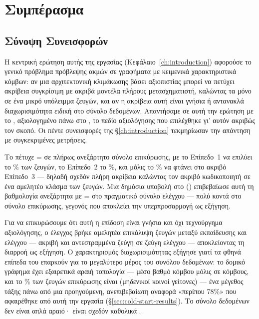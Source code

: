 

\chapter{Συμπέρασμα}
\label{ch:conclusion}


\section{Σύνοψη Συνεισφορών}
\label{sec:summary}

Η κεντρική ερώτηση αυτής της εργασίας (Κεφάλαιο~\ref{ch:introduction}) αφορούσε το
γενικό πρόβλημα πρόβλεψης ακμών σε γραφήματα με κειμενικά χαρακτηριστικά κόμβων: αν
μια αρχιτεκτονική κλιμάκωσης βάσει αξιοπιστίας μπορεί να πετύχει ακρίβεια
συγκρίσιμη με ακριβά μοντέλα πλήρους μετασχηματιστή, καλώντας τα μόνο σε ένα μικρό
υπόλειμμα ζευγών, και αν η ακρίβεια αυτή είναι γνήσια ή αντανακλά διαχωρισιμότητα
ειδική στο σύνολο δεδομένων.
Απαντήσαμε σε αυτή την ερώτηση με το ,
αξιολογημένο πάνω στο , το πεδίο αξιολόγησης που επιλέχθηκε γι' αυτόν
ακριβώς τον σκοπό.
Οι πέντε συνεισφορές της \S\ref{ch:introduction} τεκμηρίωσαν την
απάντηση με συγκεκριμένες μετρήσεις.

Το  πέτυχε  = \CascadeValFone σε πλήρως ανεξάρτητο
σύνολο επικύρωσης, με το Επίπεδο~1 να επιλύει το \TierOnePct\% των ζευγών, το
Επίπεδο~2 το \TierTwoPct\%, και μόλις το \TierThreePct\% να φτάνει στο ακριβό
Επίπεδο~3 --- δηλαδή σχεδόν πλήρη ακρίβεια καλώντας τον ακριβό κωδικοποιητή
 σε ένα αμελητέο κλάσμα των ζευγών.
Μια δημόσια υποβολή
στο  (\texttt{})
επιβεβαίωσε αυτή τη βαθμολογία ανεξάρτητα με  = \KaggleBaselinePublic
στο πραγματικό σύνολο ελέγχου --- πολύ κοντά στο σύνολο επικύρωσης, γεγονός που
αποκλείει την υπερπροσαρμογή ως εξήγηση.

Για να επικυρώσουμε ότι αυτή η επίδοση είναι γνήσια και όχι τεχνούργημα
αξιολόγησης, ο έλεγχος  βρήκε αμελητέα επικάλυψη ζευγών μεταξύ
εκπαίδευσης και ελέγχου --- \LeakageExact{} ακριβή και \LeakageReversed{}
αντεστραμμένα ζεύγη σε \TestPairs{} ζεύγη ελέγχου --- αποκλείοντας τη διαρροή ως
εξήγηση.
Ο χαρακτηρισμός διαχωρισιμότητας εξήγησε γιατί τα φθηνά επίπεδα του
 επαρκούν για το μεγαλύτερο μέρος του συνόλου δεδομένων: το δομικό
γράφημα έχει εξαιρετικά αραιή τοπολογία --- μέσο βαθμό κόμβου μόλις
\GraphMeanDegree{} σε \GraphNodes{} κόμβους, και το \ColdStartPct\% των ζευγών επικύρωσης είναι 
(μηδενικοί κοινοί γείτονες) --- ένα μέγεθος τάξης πάνω από μια
προηγούμενη, ανεπιβεβαίωτη αναφορά «περίπου 78\%» που αφαιρέθηκε από αυτή την
εργασία (\S\ref{sec:cold-start-results}). Το σύνολο δεδομένων δεν είναι απλά αραιό·
είναι σχεδόν καθολικά .

